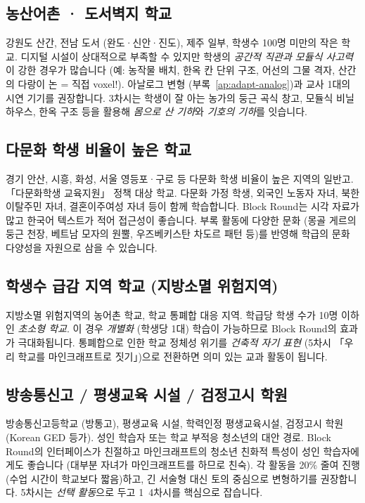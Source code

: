 \documentclass[12pt,a4paper]{scrartcl}
\begin{document}
\subsection{농산어촌 · 도서벽지 학교}
강원도 산간, 전남 도서 (완도·신안·진도), 제주 일부, 학생수 100명 미만의 작은 학교. 디지털 시설이 상대적으로 부족할 수 있지만 학생의 \emph{공간적 직관과 모듈식 사고력}이 강한 경우가 많습니다 (예: 농작물 배치, 한옥 칸 단위 구조, 어선의 그물 격자, 산간의 다랑이 논 = 직접 voxel!). 아날로그 변형 (부록~\ref{ap:adapt-analog})과 교사 1대의 시연 기기를 권장합니다. 3차시는 학생이 잘 아는 농가의 둥근 곡식 창고, 모듈식 비닐하우스, 한옥 구조 등을 활용해 \emph{몸으로 산 기하}와 \emph{기호의 기하}를 잇습니다.

\subsection{다문화 학생 비율이 높은 학교}
경기 안산, 시흥, 화성, 서울 영등포·구로 등 다문화 학생 비율이 높은 지역의 일반고. 「다문화학생 교육지원」 정책 대상 학교. 다문화 가정 학생, 외국인 노동자 자녀, 북한이탈주민 자녀, 결혼이주여성 자녀 등이 함께 학습합니다. Block Round는 시각 자료가 많고 한국어 텍스트가 적어 접근성이 좋습니다. 부록 활동에 다양한 문화 (몽골 게르의 둥근 천장, 베트남 모자의 원뿔, 우즈베키스탄 차도르 패턴 등)를 반영해 학급의 문화 다양성을 자원으로 삼을 수 있습니다.

\subsection{학생수 급감 지역 학교 (지방소멸 위험지역)}
지방소멸 위험지역의 농어촌 학교, 학교 통폐합 대응 지역. 학급당 학생 수가 10명 이하인 \emph{초소형 학교}. 이 경우 \emph{개별화} (학생당 1대) 학습이 가능하므로 Block Round의 효과가 극대화됩니다. 통폐합으로 인한 학교 정체성 위기를 \emph{건축적 자기 표현} (5차시 「우리 학교를 마인크래프트로 짓기」)으로 전환하면 의미 있는 교과 활동이 됩니다.

\subsection{방송통신고 / 평생교육 시설 / 검정고시 학원}
방송통신고등학교 (방통고), 평생교육 시설, 학력인정 평생교육시설, 검정고시 학원 (Korean GED 등가). 성인 학습자 또는 학교 부적응 청소년의 대안 경로. Block Round의 인터페이스가 친절하고 마인크래프트의 청소년 친화적 특성이 성인 학습자에게도 좋습니다 (대부분 자녀가 마인크래프트를 하므로 친숙). 각 활동을 20\% 줄여 진행 (수업 시간이 학교보다 짧음)하고, 긴 서술형 대신 토의 중심으로 변형하기를 권장합니다. 5차시는 \emph{선택 활동}으로 두고 1~4차시를 핵심으로 잡습니다.
\end{document}
